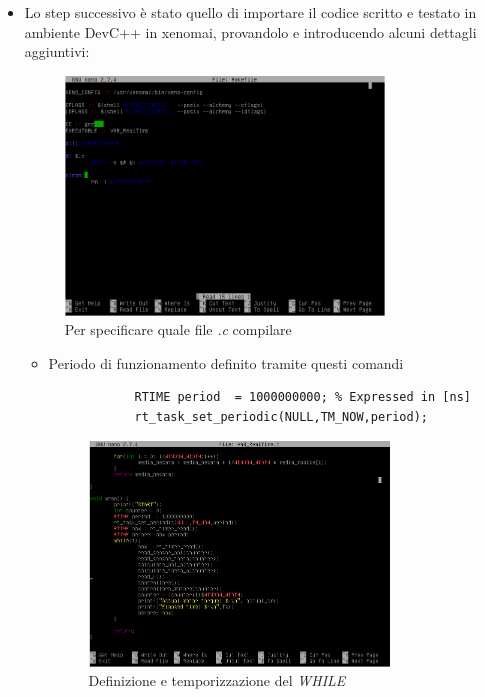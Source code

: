 \begin{itemize}
	\item Lo step successivo è stato quello di importare il codice scritto e testato in ambiente DevC++ in xenomai, provandolo e introducendo alcuni dettagli aggiuntivi:
	\begin{figure}[H]
		\centering   	
		\includegraphics[width=0.8\textwidth]{Immagini/xenomai_nano_make.png}
		\caption{Per specificare quale file \textit{.c} compilare}
		\label{fig:xenomai_nano_make}
	\end{figure}
	\begin{itemize}
		\item Periodo di funzionamento definito tramite questi comandi 
		\begin{lstlisting}
			RTIME period  = 1000000000; % Expressed in [ns]
			rt_task_set_periodic(NULL,TM_NOW,period);
		\end{lstlisting}
		\begin{figure}[H]
			\centering   	
			\includegraphics[width=0.8\textwidth]{Immagini/xenomai_nano.png}
			\caption{Definizione e temporizzazione del \textit{WHILE}}

\end{figure}
\end{itemize}
\end{itemize}
